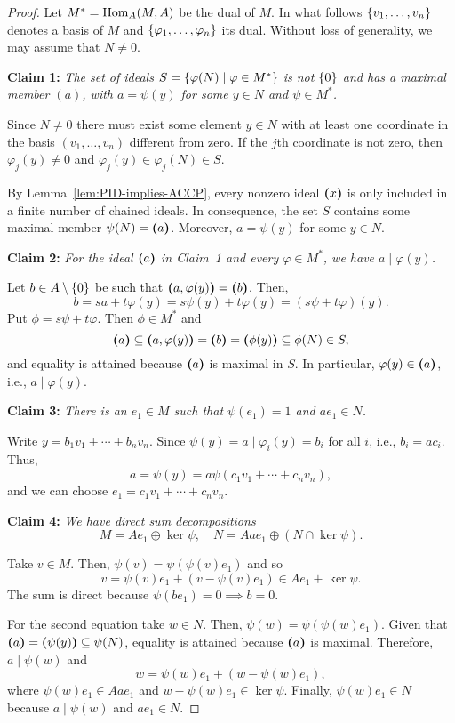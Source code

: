 \begin{proof} Let $M^*={\rm Hom}_A(M,A)$ be the dual of $M$. In what follows $\{v_1,\dots,v_n\}$ denotes a basis of $M$ and $\{\varphi_1,\dots,\varphi_n\}$ its dual. Without loss of generality, we may assume that $N\ne0$.

\textbf{Claim 1:} \textit{The set of ideals $S=\{\varphi(N) \mid \varphi\in M^*\}$ is not\/ $\{0\}$ and has a maximal member\/ $(a)$, with\/ $a=\psi(y)$ for some $y\in N$ and $\psi\in M^*$.}

Since $N\ne0$ there must exist some element $y\in N$ with at least one coordinate in the basis $(v_1,\dots,v_n)$ different from zero. If the $j$th coordinate is not zero, then $\varphi_j(y)\ne0$ and $\varphi_j(y)\in\varphi_j(N)\in S$.

By Lemma~\ref{lem:PID-implies-ACCP}, every nonzero ideal $\textrm{\boldmath$($}x\textrm{\boldmath$)$}$ is only included in a finite number of chained ideals. In consequence, the set $S$ contains some maximal member $\psi(N)=\textrm{\boldmath$($}a\textrm{\boldmath$)$}$. Moreover, $a=\psi(y)$ for some $y\in N$.

\textbf{Claim 2:} \textit{For the ideal\/ $\textrm{\boldmath$($}a\textrm{\boldmath$)$}$ in\/ {\rm Claim~1} and every\/ $\varphi\in M^*$, we have\/ $a \mid \varphi(y)$.}

Let $b\in A\setminus\{0\}$ be such that $\textrm{\boldmath$($}a,\varphi(y)\textrm{\boldmath$)$}=\textrm{\boldmath$($}b\textrm{\boldmath$)$}$. Then,
$$
    b = sa+t\varphi(y) = s\psi(y)+t\varphi(y)=(s\psi+t\varphi)(y).
$$
Put $\phi=s\psi+t\varphi$. Then $\phi\in M^*$ and
$$
    \textrm{\boldmath$($}a\textrm{\boldmath$)$}\subseteq\textrm{\boldmath$($}a,\varphi(y)\textrm{\boldmath$)$}=\textrm{\boldmath$($}b\textrm{\boldmath$)$}=\textrm{\boldmath$($}\phi(y)\textrm{\boldmath$)$}
        \subseteq\phi(N)\in S,
$$
and equality is attained because $\textrm{\boldmath$($}a\textrm{\boldmath$)$}$ is maximal in $S$. In particular, $\varphi(y)\in\textrm{\boldmath$($}a\textrm{\boldmath$)$}$, i.e., $a\mid\varphi(y)$.

\textbf{Claim 3:} \textit{There is an\/ $e_1\in M$ such that\/ $\psi(e_1)=1$ and\/ $ae_1\in N$.}

Write $y=b_1v_1+\cdots+b_nv_n$. Since $\psi(y)=a\mid\varphi_i(y)=b_i$ for all $i$, i.e., $b_i=ac_i$. Thus,
$$
    a = \psi(y) = a\psi(c_1v_1+\cdots+c_nv_n),
$$
and we can choose $e_1=c_1v_1+\cdots+c_nv_n$.

\textbf{Claim 4:} \textit{We have direct sum decompositions}
$$
    M = A e_1 \oplus \ker \psi,
        \quad
    N = A a e_1 \oplus (N \cap \ker \psi).
$$

Take $v\in M$. Then, $\psi(v)=\psi(\psi(v)e_1)$ and so
$$
    v = \psi(v)e_1 + (v-\psi(v)e_1) \in Ae_1+\ker\psi.
$$
The sum is direct because $\psi(be_1)=0\implies b=0$.

For the second equation take $w\in N$. Then, $\psi(w)=\psi(\psi(w)e_1)$. Given that $\textrm{\boldmath$($}a\textrm{\boldmath$)$}=\textrm{\boldmath$($}\psi(y)\textrm{\boldmath$)$}\subseteq\psi(N)$, equality is attained because $\textrm{\boldmath$($}a\textrm{\boldmath$)$}$ is maximal. Therefore, $a\mid \psi(w)$ and
$$
    w = \psi(w)e_1+(w-\psi(w)e_1),
$$
where $\psi(w)e_1\in Aae_1$ and $w-\psi(w)e_1\in\ker\psi$. Finally, $\psi(w)e_1\in N$ because $a\mid\psi(w)$ and $ae_1\in N$.


\end{proof}
